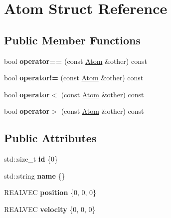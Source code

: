 \hypertarget{structAtom}{}\section{Atom Struct Reference}
\label{structAtom}
\subsection*{Public Member Functions}
\begin{DoxyCompactItemize}
\item 
\mbox{\label{structAtom_afdda6123eb6378f48a81d4860ba2f193}} 
bool {\bfseries operator==} (const \mbox{\hyperlink{structAtom}{Atom}} \&other) const
\item 
\mbox{\label{structAtom_af989a0a832cb20ba634432a7bb5b1419}} 
bool {\bfseries operator!=} (const \mbox{\hyperlink{structAtom}{Atom}} \&other) const
\item 
\mbox{\label{structAtom_a3bd520b3b4b590626ea3c9b285ef2bec}} 
bool {\bfseries operator$<$} (const \mbox{\hyperlink{structAtom}{Atom}} \&other) const
\item 
\mbox{\label{structAtom_a7c849476ba49a1eedd6a1309065ce2ff}} 
bool {\bfseries operator$>$} (const \mbox{\hyperlink{structAtom}{Atom}} \&other) const
\end{DoxyCompactItemize}
\subsection*{Public Attributes}
\begin{DoxyCompactItemize}
\item 
\mbox{\label{structAtom_a5ac7dd8b24a3e438c2e19b1ca8e1b7c8}} 
std\+::size\+\_\+t {\bfseries id} \{0\}
\item 
\mbox{\label{structAtom_a7ad8efbefc804cbff230750350283136}} 
std\+::string {\bfseries name} \{\}
\item 
\mbox{\label{structAtom_a482804d6dc561ba73a8d543b2e6eb450}} 
R\+E\+A\+L\+V\+EC {\bfseries position} \{0, 0, 0\}
\item 
\mbox{\label{structAtom_aee46bbc59f76f455219eb94367a6641b}} 
R\+E\+A\+L\+V\+EC {\bfseries velocity} \{0, 0, 0\}
\end{DoxyCompactItemize}
